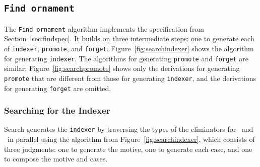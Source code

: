 \subsection{\lstinline{Find ornament}}
\label{sec:findalg}

The \lstinline{Find ornament} algorithm implements the specification from Section~\ref{sec:findspec}.
It builds on three intermediate steps: one to generate each of \lstinline{indexer},
\lstinline{promote}, and \lstinline{forget}. 
Figure~\ref{fig:searchindexer} shows the algorithm for generating \lstinline{indexer}.
The algorithms for generating \lstinline{promote} and \lstinline{forget} are similar;
Figure~\ref{fig:searchpromote} shows only the derivations for generating \lstinline{promote}
that are different from those for generating \lstinline{indexer}, and 
the derivations for generating \lstinline{forget} are omitted.

\subsubsection{Searching for the Indexer}

Search generates the \lstinline{indexer} by traversing the types of the eliminators for \Aa\ and \B\ in parallel using the algorithm from Figure~\ref{fig:searchindexer},
which consists of three judgments: one to generate the motive, one to generate each case,
and one to compose the motive and cases.

